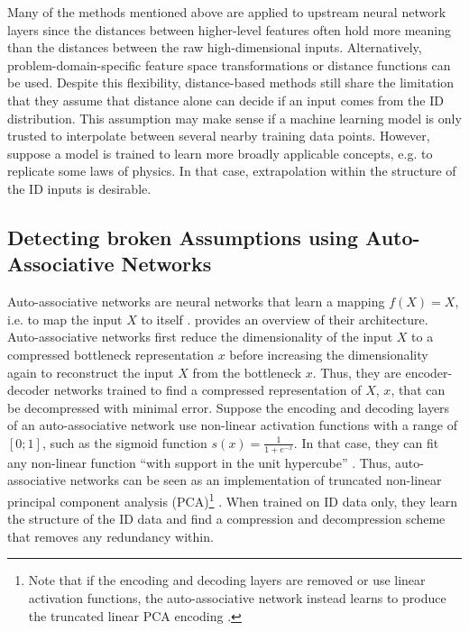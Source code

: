 \newpar Many of the methods mentioned above are applied to upstream neural network layers since the distances between higher-level features often hold more meaning than the distances between the raw high-dimensional inputs. Alternatively, problem-domain-specific feature space transformations or distance functions can be used. Despite this flexibility, distance-based methods still share the limitation that they assume that distance alone can decide if an input comes from the ID distribution. This assumption may make sense if a machine learning model is only trusted to interpolate between several nearby training data points. However, suppose a model is trained to learn more broadly applicable concepts, e.g. to replicate some laws of physics. In that case, extrapolation within the structure of the ID inputs is desirable.

\subsection{Detecting broken Assumptions using Auto-Associative Networks} \label{txt:auto-associative}

Auto-associative networks are neural networks that learn a mapping $f(X) = X$, i.e. to map the input $X$ to itself \cite{auto-associative-2001}.  provides an overview of their architecture. Auto-associative networks first reduce the dimensionality of the input $X$ to a compressed bottleneck representation $x$ before increasing the dimensionality again to reconstruct the input $X$ from the bottleneck $x$. Thus, they are encoder-decoder networks trained to find a compressed representation of $X$, $x$, that can be decompressed with minimal error. Suppose the encoding and decoding layers of an auto-associative network use non-linear activation functions with a range of $[0; 1]$, such as the sigmoid function $s(x) = \frac{1}{1 + e^{-x}}$. In that case, they can fit any non-linear function ``with support in the unit hypercube'' \cite{non-linear-pca-1989}. Thus, auto-associative networks can be seen as an implementation of truncated non-linear principal component analysis (PCA)\footnote{Note that if the encoding and decoding layers are removed or use linear activation functions, the auto-associative network instead learns to produce the truncated linear PCA encoding \cite{auto-associative-2001}.} \cite{auto-associative-2001}. When trained on ID data only, they learn the structure of the ID data and find a compression and decompression scheme that removes any redundancy within.

